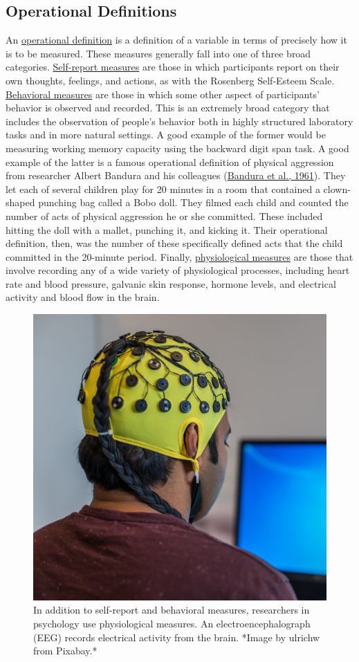 \documentclass[
]{krantz}
\begin{document}
\hypertarget{operational-definitions}{%
\subsection*{Operational Definitions}\label{operational-definitions}}


An \protect\hyperlink{operational-definition-1}{operational definition} is a definition of a variable in terms of precisely how it is to be measured. These measures generally fall into one of three broad categories. \protect\hyperlink{self-report-measure}{Self-report measures} are those in which participants report on their own thoughts, feelings, and actions, as with the Rosenberg Self-Esteem Scale. \protect\hyperlink{behavioral-measure}{Behavioral measures} are those in which some other aspect of participants' behavior is observed and recorded. This is an extremely broad category that includes the observation of people's behavior both in highly structured laboratory tasks and in more natural settings. A good example of the former would be measuring working memory capacity using the backward digit span task. A good example of the latter is a famous operational definition of physical aggression from researcher Albert Bandura and his colleagues (\protect\hyperlink{ref-bandura1961transmission}{Bandura et al., 1961}). They let each of several children play for 20 minutes in a room that contained a clown-shaped punching bag called a Bobo doll. They filmed each child and counted the number of acts of physical aggression he or she committed. These included hitting the doll with a mallet, punching it, and kicking it. Their operational definition, then, was the number of these specifically defined acts that the child committed in the 20-minute period. Finally, \protect\hyperlink{physiological-measure}{physiological measures} are those that involve recording any of a wide variety of physiological processes, including heart rate and blood pressure, galvanic skin response, hormone levels, and electrical activity and blood flow in the brain.

\begin{figure}

{\centering \includegraphics[width=0.5\linewidth]{images/measurement/eeg} 

}

\caption{In addition to self-report and behavioral measures, researchers in psychology use physiological measures. An electroencephalograph (EEG) records electrical activity from the brain. *Image by ulrichw from Pixabay.*}\label{fig:eeg}
\end{figure}
\end{document}

